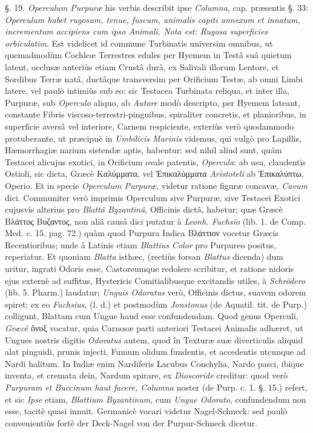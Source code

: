 \documentclass[a4paper, 11pt, oneside, polutonikogreek, german]{article}
\begin{document}
§. 19. \emph{Operculum Purpuræ} his verbis describit ipse \emph{Columna}, cap. præsentis §. 33: \emph{Operculum habet rugosum, tenue, fuscum, animalis capiti annexum et innatum, incrementum accipiens cum ipso Animali. Nota est: Rugosa superficies orbiculatim}. Est videlicet id commune Turbinatis universim omnibus, ut quemadmodùm Cochleæ Terrestres edules per Hyemem in Testâ suâ quietum latent, occlusæ anteriùs etiam Crustâ durà, ex Salivali illorum Lentore, et Sordibus Terræ natâ, ductâque transversim per Orificium Testæ, ab omni Limbi latere, vel paulò intimiùs sub eo: sic Testacea Turbinata reliqua, et inter illa, Purpuræ, sub \emph{Operculo} aliquo, ab \emph{Autore} modò descripto, per Hyemem lateant, constante Fibris viscoso-terrestri-pinguibus, spiraliter concretis, et planioribus, in superficie aversâ vel interiore, Carnem respiciente, exteriùs verò quodammodo protuberante, ut præcipuè in \emph{Umbilicis Marinis} videmus, qui vulgò pro Lapillis, Hæmorrhagiæ narium sistendæ aptis, habentur: sed nihil aliud sunt, quám Testacei alicujus exotici, in Orificium ovale patentis, \emph{Opercula}: ab usu, claudentis Ostioli, sic dicta, Græcè Καλύμματα, vel Ἐπικαλύμματα \emph{Aristoteli} ab Ἐπικαλύπτω, Operio. Et in specie \emph{Operculum Purpuræ}, videtur ratione figuræ concavæ, \emph{Cavum} dici. Communiter verò imprimis Operculum sive Purpuræ, sive Testacei Exotici cujusvis alterius pro \emph{Blattâ Byzantinâ}, Officinis dictâ, habetur; quæ Græcè Βλάττος Βυζαντος, non aliâ causâ dici putatur à \emph{Leonh. Fuchsio} (lib. 1. de Comp. Med. c. 15. pag. 72.) quàm quod Purpura Indica Βλάττιον vocetur Græcis Recentioribus; unde à Latinis etiam \emph{Blattius Color} pro Purpureo positus, reperiatur. Et quoniam \emph{Blatta} isthæc, (rectiùs forsan \emph{Blattus} dicenda) dum uritur, ingrati Odoris esse, Castoreumque redolere scribitur, et ratione nidoris ejus externè ad suffitus, Hystericis Comitialibusque excitandis utiles, à \emph{Schrödero} (lib. 5. Pharm.) laudatur; \emph{Unguis Odoratus} verò, Officinis dictus, suavem odorem spiret; ex eo \emph{Fuchsius}, (l. d.) et postmodùm \emph{Jonstonus} (de Aquatil. tit. de Purp.) colligunt, Blattam cum Ungue haud esse confundendam. Quod genus Operculi, \emph{Græcê} ὄνυξ vocatur, quia Carnosæ parti anteriori Testacei Animalis adhæret, ut Ungues nostris digitis \emph{Odoratus} autem, quod în Texturæ suæ diverticulis aliquid alat pinguidi, prunis injecti, Fumum olidum fundentis, et accedentis utcunque ad Nardi halitum. In Indiæ enim Nardiferis Lacubus Conchylia, Nardo pasci, ibique inventa, et cremata dein, Nardum spirare, ex \emph{Dioscoride} creditur: quod verò \emph{Purpuram et Buccinum haut facere, Columna} noster (de Purp. c. 1. §. 15.) refert, et sic \emph{Ipse} etiam, \emph{Blattium Byzantinum}, cum \emph{Ungue Odorato}, confundendum non esse, tacitè quasi innuit. Germanicè vocari videtur Nagel-Schneck: sed paulò convenientiùs fortè der Deck-Nagel von der Purpur-Schneck dicetur.
\end{document}
